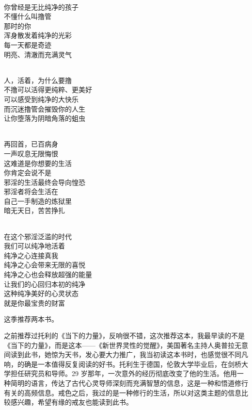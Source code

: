 \begin{poem}[永恒纯净]
    \begin{multicols}{2}
        \begin{center}~\\
            你曾经是无比纯净的孩子 \\ 不懂什么叫撸管 \\ 那时的你 \\ 浑身散发着纯净的光彩 \\ 每一天都是奇迹 \\ 明亮、清澈而充满灵气

            ~\\

            人，活着，为什么要撸 \\ 不撸可以活得更纯粹、更美好 \\ 可以感受到纯净的大快乐 \\ 而沉迷撸管会摧毁你的人生 \\ 让你堕落为阴暗角落的蛆虫

            ~\\

            再回首，已百病身 \\ 一声叹息无限悔恨 \\ 这难道是你想要的生活 \\ 你肯定会说不是 \\ 邪淫的生活最终会导向惶恐 \\ 邪淫者将会生活在 \\ 自己一手制造的炼狱里 \\ 暗无天日，苦苦挣扎

            ~\\

            在这个邪淫泛滥的时代 \\ 我们可以纯净地活着 \\ 纯净之心连接真我 \\ 纯净之心会带来无限的喜悦 \\ 纯净之心也会释放超强的能量 \\ 让我们的心回归本初的纯净 \\ 这种纯净美好的心灵状态 \\ 就是你最宝贵的财富
        \end{center}
    \end{multicols}
\end{poem}

这季推荐两本书。

\begin{book}[《新世界灵性的觉醒》]
    之前推荐过托利的《当下的力量》，反响很不错，这次推荐这本，我最早读的不是《当下的力量》，而是这本——《新世界灵性的觉醒》，美国著名主持人奥普拉无意间读到此书，她惊为天书，发心要大力推广，我当初读这本书时，也感觉很不同凡响，的确是一本值得反复阅读的好书。托利生于德国，伦敦大学毕业后，在剑桥大学担任研究员和导师。29 岁那年，一次意外的经历彻底改变了他的生活。他用一种简明的语言，传达了古代心灵导师深刻而充满智慧的信息，这是一种和悟道修行有关的高频信息。戒色之后，我过的是一种修行的生活，所以对这类主题的信息比较感兴趣，希望有缘的戒友也能读到此书。
\end{book}


